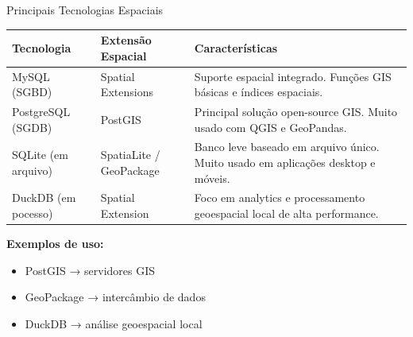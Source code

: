 \documentclass{beamer}
\begin{document}
\begin{frame}{Principais Tecnologias Espaciais}

    \begin{table}
    \centering
    \scriptsize
    \begin{tabular}{|p{2.3cm}|p{2.7cm}|p{4.2cm}|}
    \hline
    \textbf{Tecnologia} & \textbf{Extensão Espacial} & \textbf{Características} \\
    \hline
    
    MySQL (SGBD)&
    Spatial Extensions &
    Suporte espacial integrado. Funções GIS básicas e índices espaciais. \\
    
    \hline
    
    PostgreSQL (SGDB)&
    PostGIS &
    Principal solução open-source GIS. Muito usado com QGIS e GeoPandas. \\
    
    \hline
    
    SQLite (em arquivo) &
    SpatiaLite / GeoPackage &
    Banco leve baseado em arquivo único. Muito usado em aplicações desktop e móveis. \\
    
    \hline
    
    DuckDB (em pocesso)&
    Spatial Extension &
    Foco em analytics e processamento geoespacial local de alta performance. \\
    
    \hline
    
    \end{tabular}
    \end{table}
    
    \vspace{0.3cm}
    
    \textbf{Exemplos de uso:}
    \begin{itemize}
        \item PostGIS → servidores GIS
        \item GeoPackage → intercâmbio de dados
        \item DuckDB → análise geoespacial local
    \end{itemize}

\end{frame}
\end{document}
